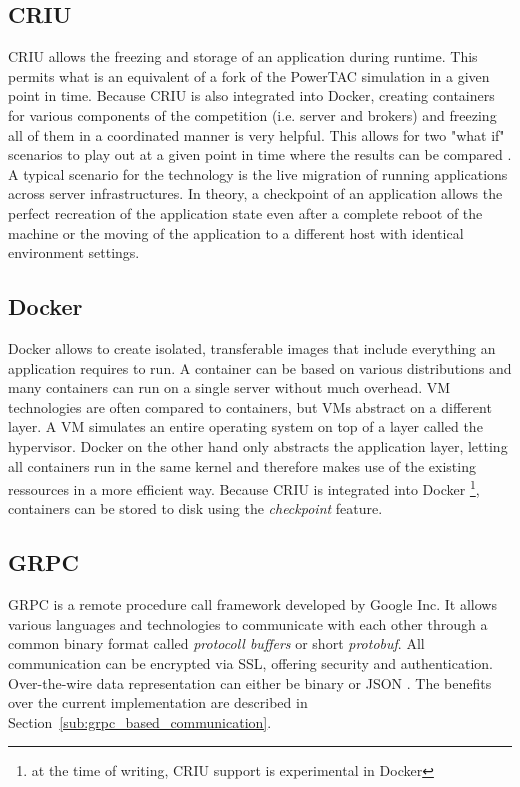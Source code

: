 \subsection{CRIU}%
\label{sub:criu}
\ac{CRIU} allows the freezing and storage of an application during runtime. This permits what is an equivalent of a fork
of the \ac{PowerTAC} simulation in a given point in time. Because \ac{CRIU} is also integrated into Docker, creating
containers for various components of the competition (i.e. server and brokers) and freezing all of them in a coordinated
manner is very helpful. This allows for two "what if" scenarios to play out at a given point in time where the results
can be compared \citep{criu}. A typical scenario for the technology is the live migration of running applications across
server infrastructures. In theory, a checkpoint of an application allows the perfect recreation of the application state
even after a complete reboot of the machine or the moving of the application to a different host with identical
environment settings.

\subsection{Docker}
\label{sub:docker}


Docker allows to create isolated, transferable images that include everything an application requires to run. A
container can be based on various distributions and many containers can run on a single server without much overhead.
\ac{VM} technologies are often compared to containers, but \ac{VM}s abstract on a different layer. A \ac{VM} simulates
an entire operating system on top of a layer called the hypervisor. Docker on the other hand only abstracts the
application layer, letting all containers run in the same kernel and therefore makes use of the existing ressources in a
more efficient way. Because \ac{CRIU} is integrated into Docker
\footnote{at the time of writing, CRIU support is experimental in Docker},
containers can be stored to disk using the \emph{checkpoint} feature.

\subsection{\ac{GRPC}}%
\label{sub:grpc}

\acf {GRPC} is a remote procedure call framework developed by Google Inc. It allows various languages and technologies to
communicate with each other through a common binary format called \emph{protocoll buffers} or short \emph{protobuf}. All communication can be encrypted via SSL, offering
security and authentication. Over-the-wire data representation can either be binary or \ac{JSON}
\citep[]{grpc}. The benefits over the
current implementation are described in Section~\ref{sub:grpc_based_communication}.


